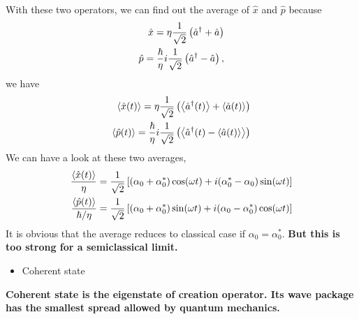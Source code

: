 \documentclass[letterpaper,10pt,english]{sphinxmanual}
\newcommand{\avg}[1]{\left< #1 \right>}
\begin{document}
With these two operators, we can find out the average of \(\hat x\) and \(\hat p\) because
\begin{gather}
\begin{split}\hat x = \eta \frac{1}{\sqrt 2} \left( \hat a^\dagger + \hat a\right)\\
\hat p = \frac{\hbar}{\eta} i \frac{1}{\sqrt 2} \left(\hat a^\dagger - \hat a \right) ,\end{split}\notag
\end{gather}
we have
\begin{gather}
\begin{split}\avg{\hat x(t)} = \eta \frac{1}{\sqrt 2} \left( \avg{\hat a^\dagger (t)} + \avg{\hat a(t)} \right) \\
\avg{\hat p(t)} = \frac{\hbar}{\eta} i \frac{1}{\sqrt {2} } \left( \avg{\hat a^\dagger (t) - \avg{\hat a(t)}} \right)\end{split}\notag
\end{gather}
We can have a look at these two averages,
\begin{gather}
\begin{split}\frac{\avg{\hat x(t)} }{\eta} = \frac{1}{\sqrt{2} } \left[ (\alpha_0 + \alpha_0^*)\cos(\omega t) + i (\alpha_0^* - \alpha_0 ) \sin(\omega t) \right] \\
\frac{\avg{\hat p(t)}}{\hbar/\eta} = \frac{1}{\sqrt{2}} \left[ (\alpha_0 + \alpha_0^*) \sin(\omega t) + i( \alpha_0 - \alpha_0^*)\cos(\omega t) \right]\end{split}\notag
\end{gather}
It is obvious that the average reduces to classical case if \(\alpha_0 = \alpha_0^*\). \textbf{But this is too strong for a semiclassical limit.}
\begin{itemize}
\item {} 
Coherent state

\end{itemize}

\textbf{Coherent state is the eigenstate of creation operator. Its wave package has the smallest spread allowed by quantum mechanics.}
\end{document}
